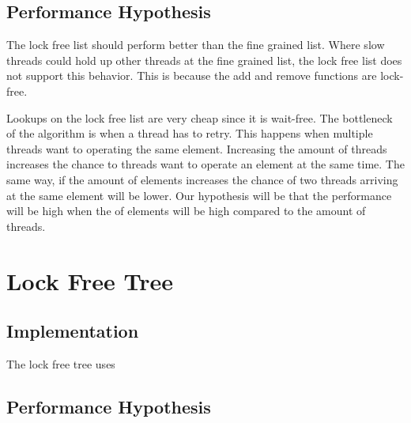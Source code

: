 \documentclass[10pt,a4paper]{article}
\begin{document}
\subsection{Performance Hypothesis}
The lock free list should perform better than the fine grained list. Where slow threads
could hold up other threads at the fine grained list, the lock free list does not support 
this behavior. This is because the add and remove functions are lock-free.

Lookups on the lock free list are very cheap since it is wait-free. The bottleneck of the 
algorithm is when a thread has to retry. This happens when multiple threads want to operating the same element.
Increasing the amount of threads increases the chance to threads want to operate an element at the same time.
The same way, if the amount of elements increases the chance of two threads arriving
at the same element will be lower. Our hypothesis will be that the 
performance will be high when the of elements will be high compared to the
amount of threads.


\section{Lock Free Tree}
\subsection{Implementation}
The lock free tree uses  

\subsection{Performance Hypothesis}
\end{document}
